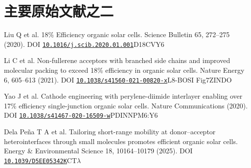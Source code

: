 \documentclass[11pt,a4paper]{article}
\makeatletter
\renewenvironment{thebibliography}[1]
 {\list{\@biblabel{\@arabic\c@enumiv}}{\settowidth\labelwidth{\@biblabel{#1}}\leftmargin\labelwidth\advance\leftmargin\labelsep\usecounter{enumiv}\setlength\itemsep{.4em}\setlength\parsep{0pt}}\sloppy}
 {\endlist}
\makeatother
\begin{document}
\medskip
\FloatBarrier
\Needspace{110pt}
\section{{\cjkfont 主要原始文献之二}\allowbreak{}}\label{sec:62}
\begin{thebibliography}{R20}
 Liu Q et al. 18\% Efficiency organic solar cells. Science Bulletin 65, 272–275 (2020). DOI \href{https://doi.org/10.1016/j.scib.2020.01.001}{\nolinkurl{10.1016/j.scib.2020.01.001}}\allowbreak{}D18\allowbreak{}CV\allowbreak{}Y6\allowbreak{}
\par
 Li C et al. Non-fullerene acceptors with branched side chains and improved molecular packing to exceed 18\% efficiency in organic solar cells. Nature Energy 6, 605–613 (2021). DOI \href{https://doi.org/10.1038/s41560-021-00820-x}{\nolinkurl{10.1038/s41560-021-00820-x}}\allowbreak{}L8-BO\allowbreak{}SI Fig7\allowbreak{}ZINDO\allowbreak{}
\par
 Yao J et al. Cathode engineering with perylene-diimide interlayer enabling over 17\% efficiency single-junction organic solar cells. Nature Communications (2020). DOI \href{https://doi.org/10.1038/s41467-020-16509-w}{\nolinkurl{10.1038/s41467-020-16509-w}}\allowbreak{}PDINN\allowbreak{}PM6:Y6\allowbreak{}
\par
 Dela Peña T A et al. Tailoring short-range mobility at donor–acceptor heterointerfaces through small molecules promotes efficient organic solar cells. Energy \& Environmental Science 18, 10164–10179 (2025). DOI \href{https://doi.org/10.1039/D5EE05342K}{\nolinkurl{10.1039/D5EE05342K}}\allowbreak{}CT\allowbreak{}\ensuremath{\lambda}\allowbreak{}

\end{thebibliography}
\end{document}
